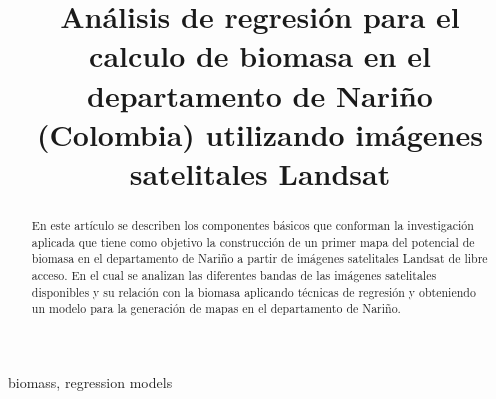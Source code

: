 \documentclass[conference]{IEEEtran}
\begin{document}
\pagestyle{empty}  


\title{Análisis de regresión para el calculo de biomasa en el departamento de Nariño (Colombia) utilizando imágenes satelitales Landsat}

\author{
\and
{}
}

\maketitle

\begin{abstract}

En este artículo se describen los componentes básicos que conforman
la investigación aplicada que tiene como objetivo la construcción de un
primer mapa del potencial de biomasa en el departamento de Nariño a
partir de imágenes satelitales Landsat de libre acceso. En el cual se 
analizan las diferentes bandas de las imágenes satelitales disponibles y
su relación con la biomasa aplicando técnicas de regresión y obteniendo un modelo
para la generación de mapas en el departamento de Nariño.

\end{abstract}
 


\begin{IEEEkeywords}
biomass, regression models 
\end{IEEEkeywords}

\thispagestyle{empty} 

\IEEEpeerreviewmaketitle










\ifCLASSOPTIONcompsoc
\end{document}
